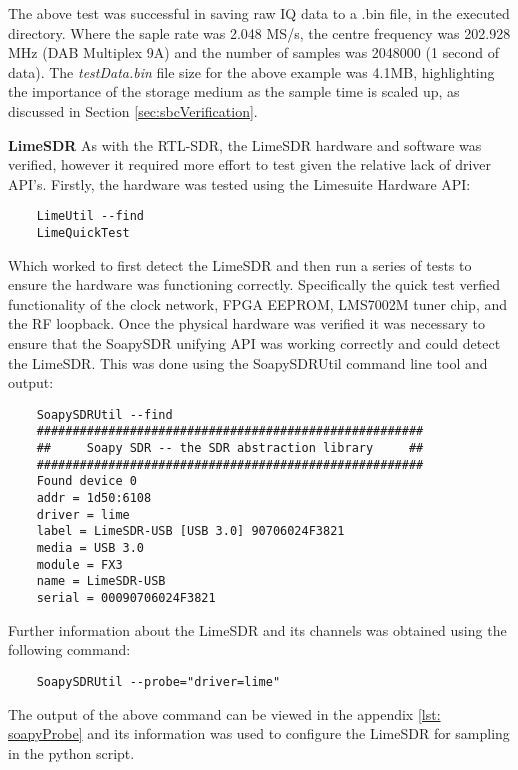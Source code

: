 \noindent
The above test was successful in saving raw IQ data to a .bin file, in the executed directory. Where the saple rate was 2.048 MS/s, the centre frequency was 202.928 MHz (DAB Multiplex 9A) and the number of samples was 2048000 (1 second of data). The \textit{testData.bin} file size for the above example was 4.1MB, highlighting the importance of the storage medium as the sample time is scaled up, as discussed in Section \ref{sec:sbcVerification}.   

\par \vspace{0.5cm}
\noindent
\textbf{LimeSDR}
As with the RTL-SDR, the LimeSDR hardware and software was verified, however it required more effort to test given the relative lack of driver API's. Firstly, the hardware was tested using the Limesuite Hardware API:
\begin{verbatim}
    LimeUtil --find
    LimeQuickTest
\end{verbatim}

\noindent
Which worked to first detect the LimeSDR and then run a series of tests to ensure the hardware was functioning correctly. Specifically the quick test verfied functionality of the clock network, FPGA EEPROM, LMS7002M tuner chip, and the RF loopback. Once the physical hardware was verified it was necessary to ensure that the SoapySDR unifying API was working correctly and could detect the LimeSDR. This was done using the SoapySDRUtil command line tool and output:

\begin{verbatim}
    SoapySDRUtil --find
    ######################################################
    ##     Soapy SDR -- the SDR abstraction library     ##
    ######################################################
    Found device 0
    addr = 1d50:6108
    driver = lime
    label = LimeSDR-USB [USB 3.0] 90706024F3821
    media = USB 3.0
    module = FX3
    name = LimeSDR-USB
    serial = 00090706024F3821
\end{verbatim}

Further information about the LimeSDR and its channels was obtained using the following command:
\begin{verbatim}
    SoapySDRUtil --probe="driver=lime"
\end{verbatim}

\noindent The output of the above command can be viewed in the appendix \ref{lst: soapyProbe} and its information was used to configure the LimeSDR for sampling in the python script.


